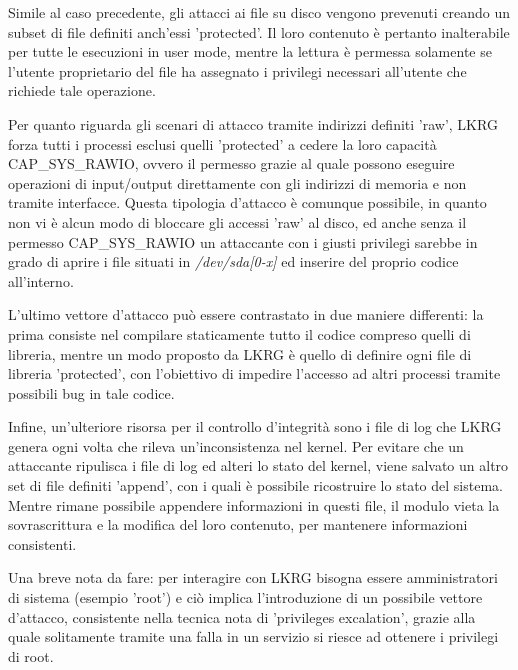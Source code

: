 Simile al caso precedente, gli attacci ai file su disco vengono prevenuti creando un subset di file definiti anch'essi 'protected'. Il loro contenuto è pertanto inalterabile per tutte le esecuzioni in user mode, mentre la lettura è permessa solamente se l'utente proprietario del file ha assegnato i privilegi necessari all'utente che richiede tale operazione.

Per quanto riguarda gli scenari di attacco tramite indirizzi definiti 'raw', LKRG forza tutti i processi esclusi quelli 'protected' a cedere la loro capacità CAP\_SYS\_RAWIO, ovvero il permesso grazie al quale possono eseguire operazioni di input/output direttamente con gli indirizzi di memoria e non tramite interfacce. Questa tipologia d'attacco è comunque possibile, in quanto non vi è alcun modo di bloccare gli accessi 'raw' al disco, ed anche senza il permesso CAP\_SYS\_RAWIO un attaccante con i giusti privilegi sarebbe in grado di aprire i file situati in \emph{/dev/sda[0-x]} ed inserire del proprio codice all'interno.

L'ultimo vettore d'attacco può essere contrastato in due maniere differenti: la prima consiste nel compilare staticamente tutto il codice compreso quelli di libreria, mentre un modo proposto da LKRG è quello di definire ogni file di libreria 'protected', con l'obiettivo di impedire l'accesso ad altri processi tramite possibili bug in tale codice.

Infine, un'ulteriore risorsa per il controllo d'integrità sono i file di log che LKRG genera ogni volta che rileva un'inconsistenza nel kernel. Per evitare che un attaccante ripulisca i file di log ed alteri lo stato del kernel, viene salvato un altro set di file definiti 'append', con i quali è possibile ricostruire lo stato del sistema. Mentre rimane possibile appendere informazioni in questi file, il modulo vieta la sovrascrittura e la modifica del loro contenuto, per mantenere informazioni consistenti.\\\par

Una breve nota da fare: per interagire con LKRG bisogna essere amministratori di sistema (esempio 'root') e ciò implica l'introduzione di un possibile vettore d'attacco, consistente nella tecnica nota di 'privileges excalation', grazie alla quale solitamente tramite una falla in un servizio si riesce ad ottenere i privilegi di root.

